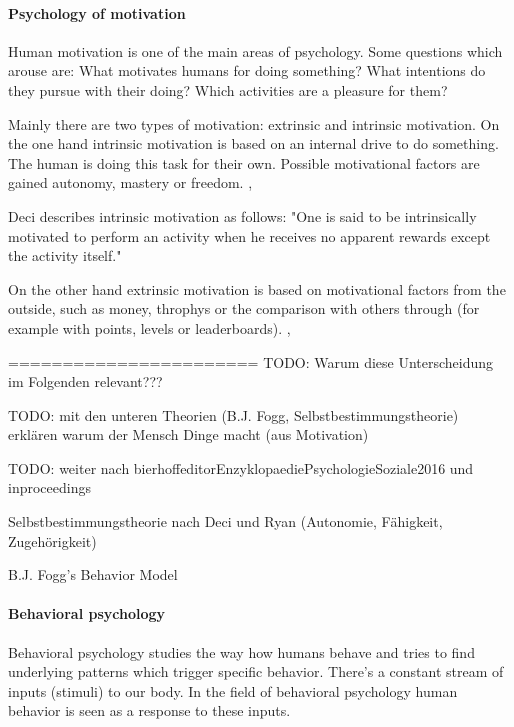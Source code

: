 \paragraph*{Psychology of motivation}
Human motivation is one of the main areas of psychology. Some questions which arouse are: What motivates humans for doing something? What intentions do they pursue with their doing? Which activities are a pleasure for them? \cite[p. 1]{bierhoffeditorEnzyklopaediePsychologieSoziale2016}

Mainly there are two types of motivation: extrinsic and intrinsic motivation. 
On the one hand intrinsic motivation is based on an internal drive to do something. The human is doing this task for their own. Possible motivational factors are gained autonomy, mastery or freedom. \cite[p. 2, 3, 4]{bierhoffeditorEnzyklopaediePsychologieSoziale2016}, \cite[p. 60, 61]{inproceedings}

Deci describes intrinsic motivation as follows: "One is said to be intrinsically motivated to perform an activity when he receives no apparent rewards except the activity itself." \cite[p. 105]{deciEffectsExternallyMediated1971}

On the other hand extrinsic motivation is based on motivational factors from the outside, such as money, throphys or the comparison with others through (for example with points, levels or leaderboards). \cite[p. 2, 3, 4]{bierhoffeditorEnzyklopaediePsychologieSoziale2016}, \cite[p. 60, 61]{inproceedings}

=======================\newline
TODO: Warum diese Unterscheidung im Folgenden relevant???

TODO: mit den unteren Theorien (B.J. Fogg, Selbstbestimmungstheorie) erklären warum der Mensch Dinge macht (aus Motivation)

TODO: weiter nach bierhoffeditorEnzyklopaediePsychologieSoziale2016
und inproceedings

Selbstbestimmungstheorie nach Deci und Ryan (Autonomie, Fähigkeit, Zugehörigkeit)

B.J. Fogg’s Behavior Model

\paragraph*{Behavioral psychology}

Behavioral psychology studies the way how humans behave and tries to find underlying patterns which trigger specific behavior. There's a constant stream of inputs (stimuli) to our body. In the field of  behavioral psychology human behavior is seen as a response to these inputs. \cite[p. 10]{lewisIrresistibleAppsMotivational2014}

